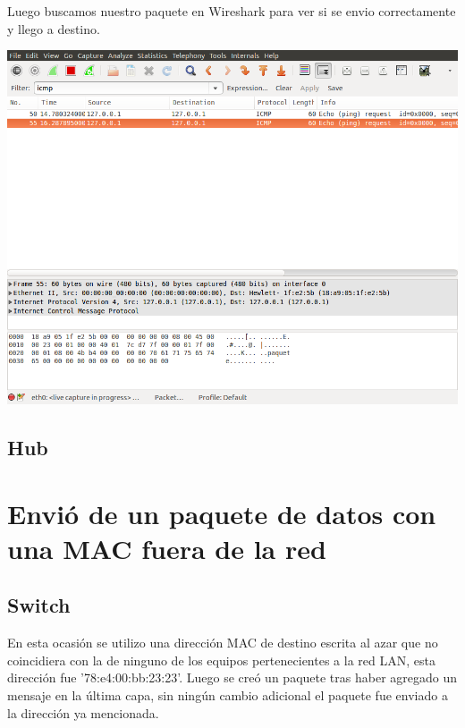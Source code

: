 \documentclass[spanish]{udpreport}
\begin{document}
Luego buscamos nuestro paquete en Wireshark para ver si se envio correctamente y llego a destino.

\begin{center}
	\includegraphics[scale=.37]{imagenes/Switch/Test_2_Wireshark.png}
\end{center}

\subsection{Hub}

\section{Envió de un paquete de datos con una MAC fuera de la red}
\subsection{Switch}

En esta ocasión se utilizo una dirección MAC de destino escrita al azar que no coincidiera con la de ninguno de los equipos pertenecientes a la red LAN, esta dirección fue ’78:e4:00:bb:23:23’. Luego se creó un paquete tras haber agregado un mensaje en la última capa, sin ningún cambio adicional el paquete fue enviado a la dirección ya mencionada.
\end{document}
